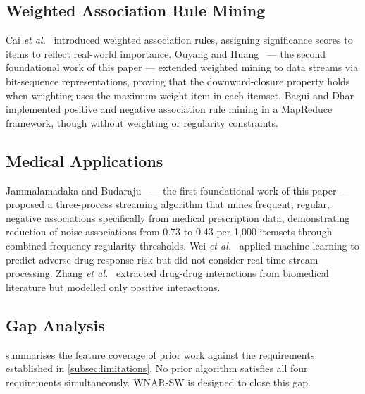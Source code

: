 \documentclass[10pt,twocolumn]{article}
\theoremstyle{plain}
\theoremstyle{definition}
\theoremstyle{remark}
\newcommand{\etal}{\textit{et al.}\xspace}
\begin{document}
\subsection{Weighted Association Rule Mining}

Cai \etal~\cite{cai1998} introduced weighted association rules,
assigning significance scores to items to reflect real-world
importance.
Ouyang and Huang~\cite{ouyang2015} — the second foundational work
of this paper — extended weighted mining to data streams via
bit-sequence representations, proving that the downward-closure
property holds when weighting uses the maximum-weight item in each
itemset.
Bagui and Dhar~\cite{bagui2019} implemented positive and negative
association rule mining in a MapReduce framework, though without
weighting or regularity constraints.

\subsection{Medical Applications}

Jammalamadaka and Budaraju~\cite{sastry2025} — the first foundational
work of this paper — proposed a three-process streaming algorithm that
mines frequent, regular, negative associations specifically from
medical prescription data, demonstrating reduction of noise
associations from 0.73 to 0.43 per 1{,}000 itemsets through
combined frequency-regularity thresholds.
Wei \etal~\cite{wei2020} applied machine learning to predict adverse
drug response risk but did not consider real-time stream processing.
Zhang \etal~\cite{zhang2020} extracted drug-drug interactions from
biomedical literature but modelled only positive interactions.

\subsection{Gap Analysis}

 summarises the feature coverage of prior work
against the requirements established in \cref{subsec:limitations}.
No prior algorithm satisfies all four requirements simultaneously.
WNAR-SW is designed to close this gap.
\end{document}

